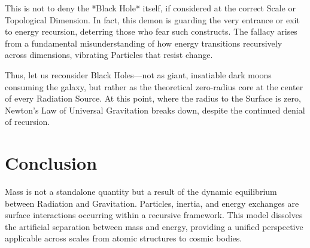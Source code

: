 \documentclass{article}
\begin{document}
This is not to deny the *Black Hole* itself, if considered at the correct Scale or Topological Dimension. In fact, this demon is guarding the very entrance or exit to energy recursion, deterring those who fear such constructs. The fallacy arises from a fundamental misunderstanding of how energy transitions recursively across dimensions, vibrating Particles that resist change.

Thus, let us reconsider Black Holes—not as giant, insatiable dark moons consuming the galaxy, but rather as the theoretical zero-radius core at the center of every Radiation Source. At this point, where the radius to the Surface is zero, Newton’s Law of Universal Gravitation breaks down, despite the continued denial of recursion.

\section{Conclusion}
Mass is not a standalone quantity but a result of the dynamic equilibrium between Radiation and Gravitation. Particles, inertia, and energy exchanges are surface interactions occurring within a recursive framework. This model dissolves the artificial separation between mass and energy, providing a unified perspective applicable across scales from atomic structures to cosmic bodies.
\end{document}
